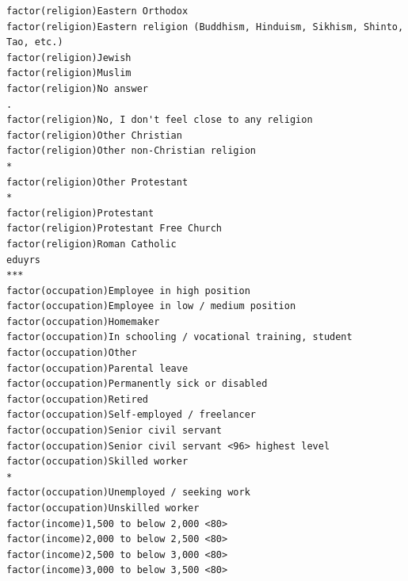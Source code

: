 \documentclass[
]{article}
\begin{document}
\begin{table}
\begin{minipage}[t]{\linewidth}
{\begin{verbatim}
factor(religion)Eastern Orthodox                                                     
factor(religion)Eastern religion (Buddhism, Hinduism, Sikhism, Shinto, Tao, etc.)    
factor(religion)Jewish                                                               
factor(religion)Muslim                                                               
factor(religion)No answer                                                         .  
factor(religion)No, I don't feel close to any religion                               
factor(religion)Other Christian                                                      
factor(religion)Other non-Christian religion                                      *  
factor(religion)Other Protestant                                                  *  
factor(religion)Protestant                                                           
factor(religion)Protestant Free Church                                               
factor(religion)Roman Catholic                                                       
eduyrs                                                                            ***
factor(occupation)Employee in high position                                          
factor(occupation)Employee in low / medium position                                  
factor(occupation)Homemaker                                                          
factor(occupation)In schooling / vocational training, student                        
factor(occupation)Other                                                              
factor(occupation)Parental leave                                                     
factor(occupation)Permanently sick or disabled                                       
factor(occupation)Retired                                                            
factor(occupation)Self-employed / freelancer                                         
factor(occupation)Senior civil servant                                               
factor(occupation)Senior civil servant <96> highest level                            
factor(occupation)Skilled worker                                                  *  
factor(occupation)Unemployed / seeking work                                          
factor(occupation)Unskilled worker                                                   
factor(income)1,500 to below 2,000 <80>                                              
factor(income)2,000 to below 2,500 <80>                                              
factor(income)2,500 to below 3,000 <80>                                              
factor(income)3,000 to below 3,500 <80>                                              

\end{verbatim}}
\end{minipage}
\end{table}
\end{document}
